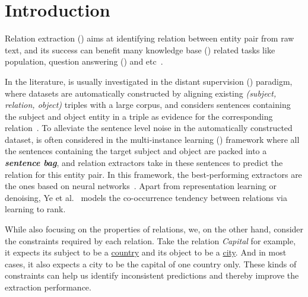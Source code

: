 \section{Introduction}

Relation extraction (\RE) aims at identifying relation between entity pair from raw text, and its success can benefit  many knowledge base (\KB) related tasks like \KB population, question answering (\QA) and etc~\cite{suchanek2013advances}.

In the literature, \RE is usually investigated in the distant supervision (\DS) paradigm, where datasets are automatically constructed by aligning existing \KB \emph{(subject, relation, object)} triples with a large corpus, and considers sentences containing the subject and object entity in a triple as evidence for the corresponding relation~\cite{mintz2009distant}.
To alleviate the sentence level noise in the automatically constructed dataset, \RE is often considered in the multi-instance learning (\MIL) framework where all the sentences containing the target subject and object are packed into a \textbf{\emph{sentence bag}}, and relation extractors take in these sentences to predict the relation for this entity pair. 
In this framework, the best-performing extractors are the ones based on neural networks~\cite{zeng2015distant,lin2016neural,zeng2018large}.
Apart from representation learning or denoising,
Ye et al.~ models the co-occurrence tendency between relations via learning to rank.

While also focusing on the properties of relations, we, on the other hand, consider the  constraints required by each relation.
Take the relation \emph{Capital} for example, it expects its subject to be a \underline{country} and its object to be a \underline{city}.
And in most cases, it also expects a city to be the capital of one country only.
These kinds of constraints can help us identify inconsistent predictions and thereby improve the extraction performance.


